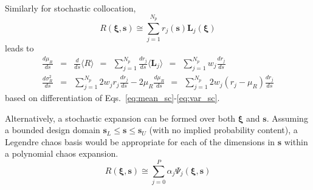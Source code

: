 Similarly for stochastic collocation,
\begin{equation}
R(\boldsymbol{\xi}, \boldsymbol{s}) \cong \sum_{j=1}^{N_p} r_j(\boldsymbol{s}) 
\boldsymbol{L}_j(\boldsymbol{\xi}) \label{eq:R_r_s_L_xi}
\end{equation}
leads to
\begin{eqnarray}
\frac{d\mu_R}{ds} &=& \frac{d}{ds} \langle R \rangle 
~~=~~ \sum_{j=1}^{N_p} \frac{dr_j}{ds} \langle \boldsymbol{L}_j \rangle 
~~=~~ \sum_{j=1}^{N_p} w_j \frac{dr_j}{ds} \label{eq:dmuR_ds_xi_sc} \\
\frac{d\sigma^2_R}{ds} &=& \sum_{j=1}^{N_p} 2 w_j r_j \frac{dr_j}{ds}
- 2 \mu_R \frac{d\mu_R}{ds} 
~~=~~ \sum_{j=1}^{N_p} 2 w_j (r_j - \mu_R) \frac{dr_j}{ds}
\label{eq:dsigR_ds_xi_sc}
\end{eqnarray}
based on differentiation of Eqs.~\ref{eq:mean_sc}-\ref{eq:var_sc}.

Alternatively, a stochastic expansion can be formed over both
$\boldsymbol{\xi}$ and $\boldsymbol{s}$.  Assuming a bounded
design domain $\boldsymbol{s}_L \le \boldsymbol{s} \le
\boldsymbol{s}_U$ (with no implied probability content), a Legendre 
chaos basis would be appropriate for each of the dimensions in 
$\boldsymbol{s}$ within a polynomial chaos expansion.
\begin{equation}
R(\boldsymbol{\xi}, \boldsymbol{s}) \cong \sum_{j=0}^P \alpha_j 
\Psi_j(\boldsymbol{\xi}, \boldsymbol{s}) \label{eq:R_alpha_psi_xi_s}
\end{equation}

